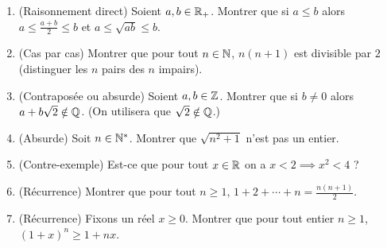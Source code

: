 \documentclass[11pt,class=report,crop=false]{standalone}
\begin{document}
\begin{miniexercices}
\sauteligne
\begin{enumerate}
  \item (Raisonnement direct) Soient $a,b \in \mathbb{R}_+$. Montrer que si $a \le b$ alors $a \le \frac{a+b}{2} \le b$ et
$a \le \sqrt{ab} \le b$.
  \item (Cas par cas) Montrer que pour tout $n\in \mathbb{N}$, $n(n+1)$ est divisible par $2$ (distinguer
les $n$ pairs des $n$ impairs).
  \item (Contraposée ou absurde) Soient $a,b \in \mathbb{Z}$. Montrer que si $b\neq 0$ alors
$a+b\sqrt{2} \notin \mathbb{Q}$. (On utilisera que $\sqrt 2 \notin \mathbb{Q}$.)
  \item (Absurde) Soit $n \in\mathbb{N}^*$. Montrer que $\sqrt{n^2+1}$ n'est pas un entier.
  \item (Contre-exemple) Est-ce que pour tout $x\in \mathbb{R}$ on a $x<2 \implies x^2<4$ ?
  \item (Récurrence) Montrer que pour tout $n \ge 1$, $1+2+ \cdots +n = \frac{n(n+1)}{2}$.
  \item (Récurrence) Fixons un réel $x\ge0$. Montrer que pour tout entier $n \ge 1$,\ \  $(1+x)^n \ge 1+nx$.
\end{enumerate}
\end{miniexercices}






\finchapitre
\end{document}
